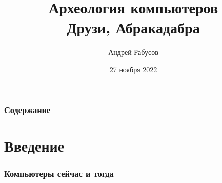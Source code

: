 \documentclass[t,aspectratio=169]{beamer}
\author{Андрей Рабусов}
\date{27 ноября 2022}
\title[Археология компьютеров]{Археология компьютеров\\
Друзи, Абракадабра}
\begin{document}
\begin{frame}
    \maketitle
\end{frame}

\begin{frame}
    \frametitle{Содержание}
    \tableofcontents[sectionstyle=show,subsectionstyle=show]
\end{frame}

\section*{Введение}
\begin{frame}
    \frametitle{Компьютеры сейчас и тогда}
    \begin{figure}
        \begin{centering}
\end{centering}
\end{figure}
\end{frame}
\end{document}
